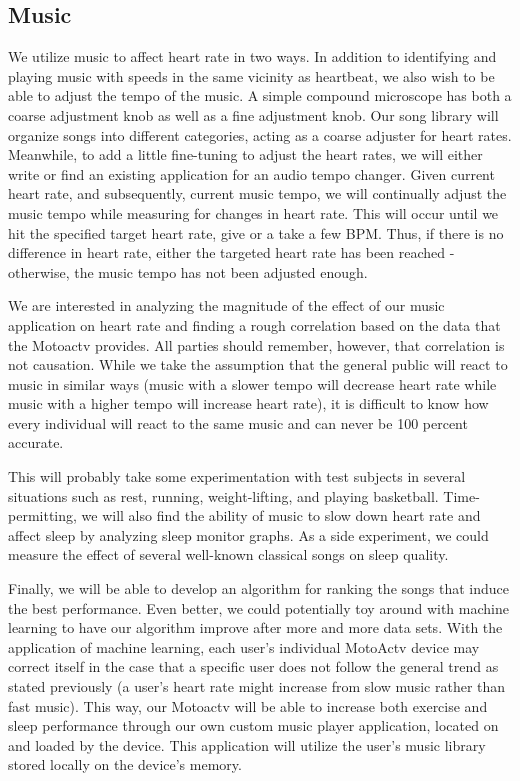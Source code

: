 \documentclass[letterpaper,english, 12pt]{scrreprt}
\begin{document}
\subsection{Music}
We utilize music to affect heart rate in two ways. In addition to identifying and playing music with speeds in the same vicinity as heartbeat, we also wish to be able to adjust the tempo of the music. A simple compound microscope has both a coarse adjustment knob as well as a fine adjustment knob. Our song library will organize songs into different categories, acting as a coarse adjuster for heart rates. Meanwhile, to add a little fine-tuning to adjust the heart rates, we will either write or find an existing application for an audio tempo changer. Given current heart rate, and subsequently, current music tempo, we will continually adjust the music tempo while measuring for changes in heart rate. This will occur until we hit the specified target heart rate, give or a take a few BPM. Thus, if there is no difference in heart rate, either the targeted heart rate has been reached - otherwise,  the music tempo has not been adjusted enough.
			 
We are interested in analyzing the magnitude of the effect of our music application on heart rate and finding a rough correlation based on the data that the Motoactv provides. All parties should remember, however, that correlation is not causation. While we take the assumption that the general public will react to music in similar ways (music with a slower tempo will decrease heart rate while music with a higher tempo will increase heart rate), it is difficult to know how every individual will react to the same music and can never be 100 percent accurate.

This will probably take some experimentation with test subjects in several situations such as rest, running, weight-lifting, and playing basketball. Time-permitting, we will also find the ability of music to slow down heart rate and affect sleep by analyzing sleep monitor graphs. As a side experiment, we could measure the effect of several well-known classical songs on sleep quality.
			 
Finally, we will be able to develop an algorithm for ranking the songs that induce the best performance. Even better, we could potentially toy around with machine learning to have our algorithm improve after more and more data sets. With the application of machine learning, each user's individual MotoActv device may correct itself in the case that a specific user does not follow the general trend as stated previously (a user's heart rate might increase from slow music rather than fast music). This way, our Motoactv will be able to increase both exercise and sleep performance through our own custom music player application, located on and loaded by the device. This application will utilize the user's music library stored locally on the device's memory.
\end{document}
